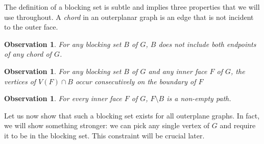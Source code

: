 \documentclass{patmorin}
\newtheorem{obs}[theorem]{Observation}
\begin{document}
The definition of a blocking set is subtle and implies three properties
that we will use throughout. A \emph{chord} in an outerplanar graph
is an edge that is not incident to the outer face.

\begin{obs}
   For any blocking set $B$ of $G$, $B$ does not include both endpoints
   of any chord of $G$.
\end{obs}

\begin{obs}
   For any blocking set $B$ of $G$ and any inner face $F$ of $G$, the
   vertices of $V(F)\cap B$ occur consecutively on the boundary of $F$ 
\end{obs}

\begin{obs}
  For every inner face $F$ of $G$, $F \setminus B$ is a non-empty path.
  \label{claim:facesMinusBarePaths}
\end{obs}
 


Let us now show that such a blocking set exists for all outerplane graphs. In fact, we will show something stronger:  we can pick any single vertex of $G$ and require it to be in the blocking set. This constraint will be crucial later.
\end{document}
